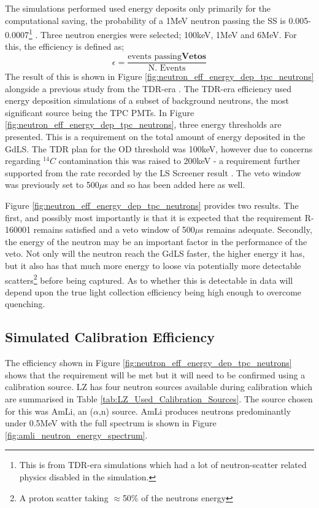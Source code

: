 \par
The simulations performed used energy deposits only primarily for the computational saving, the probability of a 1MeV neutron passing the SS is 0.005-0.0007\footnote{This is from TDR-era simulations which had a lot of neutron-scatter related physics disabled in the simulation.} \cite{sallyshaw_thesis_ref}.
Three neutron energies were selected; 100keV, 1MeV and 6MeV.
For this, the efficiency is defined as;
\begin{equation}
    \epsilon = \frac{\text{events passing}\mathbf{Vetos}}{\text{N. Events}}
    \label{eq:reduced_neutron_efficiency}
\end{equation}
The result of this is shown in Figure \ref{fig:neutron_eff_energy_dep_tpc_neutrons} alongside a previous study from the TDR-era \cite{sallyshaw_thesis_ref}.
The TDR-era efficiency used energy deposition simulations of a subset of background neutrons, the most significant source being the TPC PMTs.
In Figure \ref{fig:neutron_eff_energy_dep_tpc_neutrons}, three energy thresholds are presented.
This is a requirement on the total amount of energy deposited in the GdLS.
The TDR plan for the OD threshold was 100keV, however due to concerns regarding ${}^{14}C$ contamination this was raised to 200keV - a requirement further supported from the rate recorded by the LS Screener result \cite{scotthaselschwardt_thesis_ref}. 
The veto window was previously set to 500$\mu$s and so has been added here as well.



\par
Figure \ref{fig:neutron_eff_energy_dep_tpc_neutrons} provides two results.
The first, and possibly most importantly is that it is expected that the requirement R-160001 remains satisfied and a veto window of 500$\mu$s remains adequate.
Secondly, the energy of the neutron may be an important factor in the performance of the veto.
Not only will the neutron reach the GdLS faster, the higher energy it has, but it also has that much more energy to loose via potentially more detectable scatters\footnote{A proton scatter taking $\approx$50\% of the neutrons energy} before being captured.
As to whether this is detectable in data will depend upon the true light collection efficiency being high enough to overcome quenching.

\subsection{Simulated Calibration Efficiency}
\par
The efficiency shown in Figure \ref{fig:neutron_eff_energy_dep_tpc_neutrons} shows that the requirement will be met but it will need to be confirmed using a calibration source.
LZ has four neutron sources available during calibration which are summarised in Table \ref{tab:LZ_Used_Calibration_Sources}.
The source chosen for this was AmLi, an ($\alpha$,n) source.
AmLi produces neutrons predominantly under 0.5MeV with the full spectrum is shown in Figure \ref{fig:amli_neutron_energy_spectrum}.

